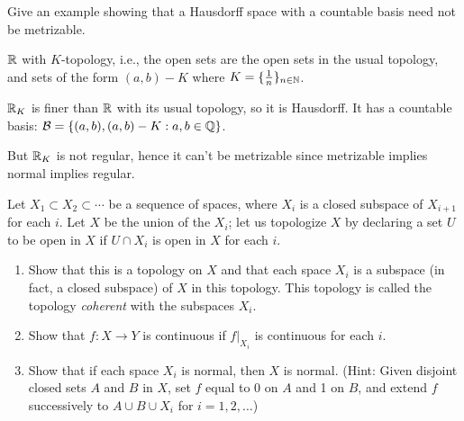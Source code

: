 \documentclass[a4paper, 10pt]{article}
\begin{document}
\begin{problem} 
    Give an example showing that a Hausdorff space with a countable basis need not be metrizable.
\end{problem}
\begin{solution}
   $\mathbb{R}$ with $K$-topology, i.e., the open sets are the open sets in the usual topology, and sets of the form $(a, b) - K$ where $K = \{\frac{1}{n}\}_{n \in \mathbb{N}}$.

   $\mathbb{R}_K$ is finer than $\mathbb{R}$ with its usual topology, so it is Hausdorff. It has a countable basis: $\mathcal{B} = \{(a, b), (a, b) - K : a, b \in \mathbb{Q}\}$.

    But $\mathbb{R}_K$ is not regular, hence it can't be metrizable since metrizable implies normal implies regular.
\end{solution}

\begin{problem} [35.9]
    Let $X_1 \subset X_2 \subset \cdots$ be a sequence of spaces, where $X_i$ is a closed subspace of $X_{i+1}$ for each $i$. Let $X$ be the union of the $X_i$; let us topologize $X$ by declaring a set $U$ to be open in $X$ if $U \cap X_i$ is open in $X$ for each $i$.
    \begin{enumerate}
    \item Show that this is a topology on $X$ and that each space $X_i$ is a subspace (in fact, a closed subspace) of $X$ in this topology. This topology is called the topology \textit{coherent} with the subspaces $X_i$.
    \item Show that $f: X \to Y$ is continuous if $f|_{X_i}$ is continuous for each $i$.
    \item Show that if each space $X_i$ is normal, then $X$ is normal. (Hint: Given disjoint closed sets $A$ and $B$ in $X$, set $f$ equal to 0 on $A$ and 1 on $B$, and extend $f$ successively to $A \cup B \cup X_i$ for $i = 1, 2, \ldots$)
    \end{enumerate}
\end{problem}
\begin{solution}
\end{solution}
\end{document}

